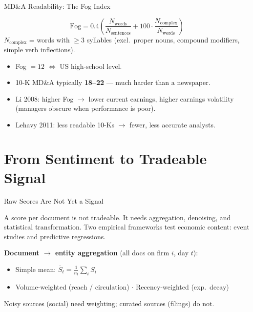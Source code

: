 \documentclass[9pt,t]{beamer}
\begin{document}
\begin{frame}{MD\&A Readability: The Fog Index}
\begin{underhood}
\[
\text{Fog} = 0.4\!\left(\frac{N_{\text{words}}}{N_{\text{sentences}}}
+ 100\cdot\frac{N_{\text{complex}}}{N_{\text{words}}}\right)
\]
$N_{\text{complex}}$ = words with $\geq 3$ syllables (excl.\ proper nouns,
compound modifiers, simple verb inflections).
\end{underhood}

\medskip
\begin{itemize}
  \item Fog $=12$ $\Leftrightarrow$ US high-school level.
  \item 10-K MD\&A typically \textbf{18--22} --- much harder than a newspaper.
  \item Li 2008: higher Fog $\to$ lower current earnings, higher earnings volatility
        (managers obscure when performance is poor).
  \item Lehavy 2011: less readable 10-Ks $\to$ fewer, less accurate analysts.
\end{itemize}
\end{frame}

\section{From Sentiment to Tradeable Signal}

\begin{frame}{Raw Scores Are Not Yet a Signal}
\begin{bigpicture}
A score per document is not tradeable. It needs aggregation, denoising, and
statistical transformation. Two empirical frameworks test economic content:
event studies and predictive regressions.
\end{bigpicture}

\medskip
\textbf{Document $\to$ entity aggregation} (all docs on firm $i$, day $t$):
\begin{itemize}\small
  \item Simple mean: $\bar S_t = \frac{1}{n_t}\sum_i S_i$
  \item Volume-weighted (reach / circulation) \quad $\cdot$ \quad Recency-weighted (exp.\ decay)
\end{itemize}
Noisy sources (social) need weighting; curated sources (filings) do not.
\end{frame}
\end{document}

